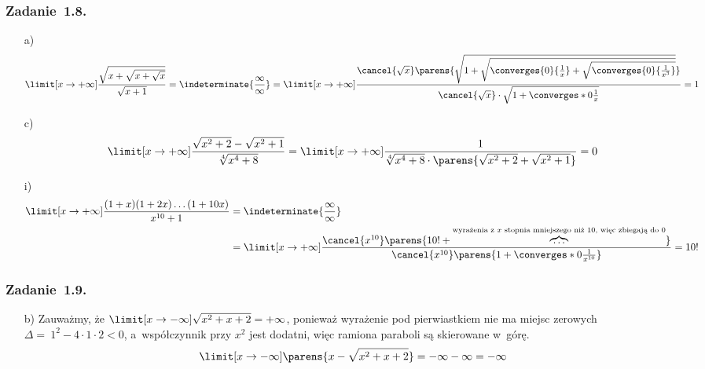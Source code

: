 \subsubsection*{Zadanie~1.8.}
\begin{itemize}
    \item[a)]
        \begin{equation*}
            \limit[x \to +\infty] \frac{\sqrt{x + \sqrt{x + \sqrt{x}}}}{\sqrt{x + 1}}
                = \indeterminate{\frac{\infty}{\infty}}
                = \limit[x \to +\infty] \frac{\cancel{\sqrt{x}}\parens{\sqrt{1 + \sqrt{\converges{0}{\frac{1}{x}} + \sqrt{\converges{0}{\frac{1}{x^3}}}}}}}{\cancel{\sqrt{x}} \cdot \sqrt{1 + \converges*{0}{\frac{1}{x}}}}
                = 1
        \end{equation*}
    \item[c)]
        \begin{equation*}
            \begin{split}
                \limit[x \to +\infty] \frac{\sqrt{x^2 + 2} - \sqrt{x^2 + 1}}{\sqrt[4]{x^4 + 8}}
                    = \limit[x \to +\infty] \frac{1}{\sqrt[4]{x^4 + 8} \cdot \parens{\sqrt{x^2 + 2} + \sqrt{x^2 + 1}}}
                    = 0
            \end{split}
        \end{equation*}
    \item[i)]
        \begin{equation*}
            \begin{split}
                \limit[x \to +\infty] \frac{(1 + x)(1 + 2x) \ldots (1 + 10x)}{x^{10} + 1}
                    &= \indeterminate{\frac{\infty}{\infty}}\\
                    &= \limit[x \to +\infty] \frac{\cancel{x^{10}} \parens{10! + \overbrace{\ldots}^{\text{wyrażenia z~\(x\) stopnia mniejszego niż \(10\), więc zbiegają do \(0\)}}}}{\cancel{x^{10}}\parens{1 + \converges*{0}{\frac{1}{x^{10}}}}}
                    = 10!
            \end{split}
        \end{equation*}
\end{itemize}
\subsubsection*{Zadanie~1.9.}
\begin{itemize}
    \item[b)] Zauważmy, że \(\limit[x \to -\infty] \sqrt{x^2 + x + 2} = +\infty\), ponieważ wyrażenie pod pierwiastkiem nie ma miejsc zerowych \(\Delta =~1^2 - 4 \cdot 1 \cdot 2 < 0\), a~współczynnik przy \(x^2\) jest dodatni, więc ramiona paraboli są skierowane w~górę.
        \begin{equation*}
            \limit[x \to -\infty] \parens{x - \sqrt{x^2 + x + 2}}
                = -\infty - \infty
                = -\infty
        \end{equation*}
\end{itemize}
